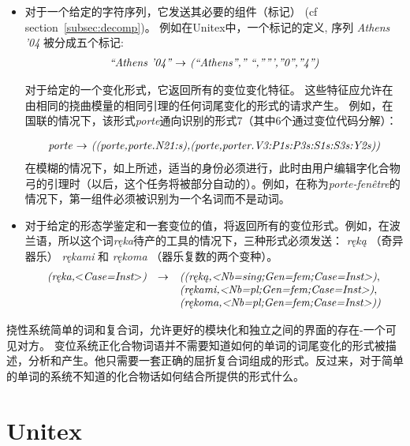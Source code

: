 \begin{itemize}
\item 对于一个给定的字符序列，它发送其必要的组件（标记） (cf section~\ref{subsec:decomp})。
例如在Unitex中，一个标记的定义, 序列 \emph{Athens '04} 被分成五个标记:
\[
\begin{array}[l]{l}
\emph{``Athens '04'' $\rightarrow$ (``Athens'','' ``,''''',''0'',''4'')}
\end{array}
\]

对于给定的一个变化形式，它返回所有的变位变化特征。
这些特征应允许在由相同的挠曲模量的相同引理的任何词尾变化的形式的请求产生。
例如，在国联的情况下，该形式\emph{porte}通向识别的形式7（其中6个通过变位代码分解）：

\[
\begin{array}[l]{l}
\emph{porte $\rightarrow$ ((porte,porte.N21:s),(porte,porter.V3:P1s:P3s:S1s:S3s:Y2s))}
\end{array}
\]
在模糊的情况下，如上所述，适当的身份必须进行，此时由用户编辑字化合物弓的引理时（以后，这个任务将被部分自动的）。例如，在称为\emph{porte-fenêtre}的情况下，第一组件必须被识别为一个名词而不是动词。
\item 对于给定的形态学鉴定和一套变位的值，将返回所有的变位形式。例如，在波兰语，所以这个词\emph{r\k{e}ka}待产的工具的情况下，三种形式必须发送： \emph{r\k{e}k\k{a}} （奇异器乐） \emph{r\k{e}kami} 和  \emph{r\k{e}koma} （器乐复数的两个变种）。
\[
\begin{array}[l]{lll}
\emph{(r\k{e}ka,$<$Case=Inst$>$)}&  \rightarrow    &
\emph{((r\k{e}k\k{a},<Nb=sing;Gen=fem;Case=Inst>)}, \\
                                    &              & \emph{(r\k{e}kami,<Nb=pl;Gen=fem;Case=Inst>)},
                                    \\
                                    &              & \emph{(r\k{e}koma,<Nb=pl;Gen=fem;Case=Inst>))}
\end{array}
\]
\end{itemize}

\bigskip
\noindent 挠性系统简单的词和复合词，允许更好的模块化和独立之间的界面的存在-一个可见对方。
变位系统正化合物词语并不需要知道如何的单词的词尾变化的形式被描述，分析和产生。他只需要一套正确的屈折复合词组成的形式。反过来，对于简单的单词的系统不知道的化合物话如何结合所提供的形式什么。     
 
\section{Unitex}
\label{section:UNITEXinterface}

